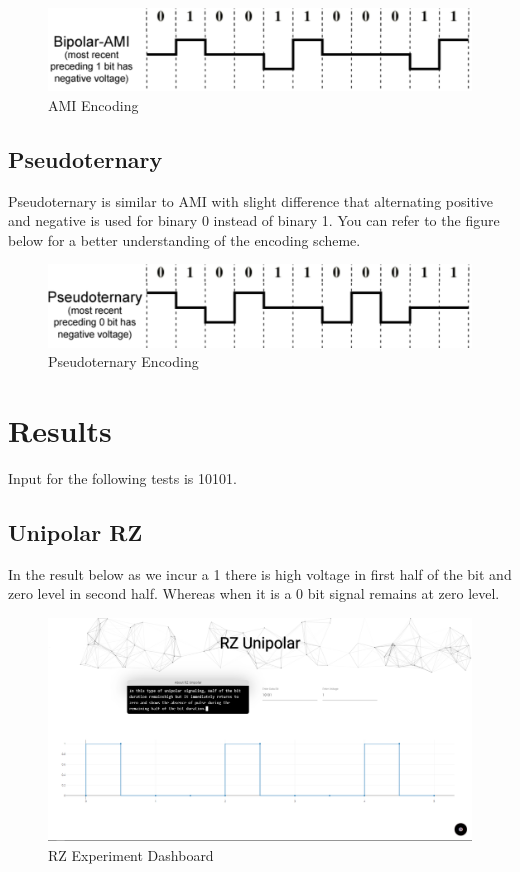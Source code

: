 \documentclass[10pt,journal,compsoc]{IEEEtran}
\begin{document}
\begin{figure}[H]
\centering
\includegraphics[scale=0.25]{encoding-ami.png}
\caption{AMI Encoding}
\end{figure}


\subsection{Pseudoternary}
Pseudoternary is similar to AMI with slight difference that alternating positive and negative is used for binary 0 instead of binary 1. You can refer to the figure below for a better understanding of the encoding scheme.

\begin{figure}[H]
\centering
\includegraphics[scale=0.25]{encoding-pseudoternary.png}
\caption{Pseudoternary Encoding}
\end{figure}

\section{Results}

Input for the following tests is 10101.

\subsection{Unipolar RZ }

In the result below as we incur a 1 there is high voltage in first half of the bit and zero level in second half. Whereas when it is a 0 bit signal remains at zero level. 

\begin{figure}[H]
\centering
\includegraphics[scale=0.15]{rz.png}
\caption{RZ Experiment Dashboard}
\end{figure}
\end{document}

